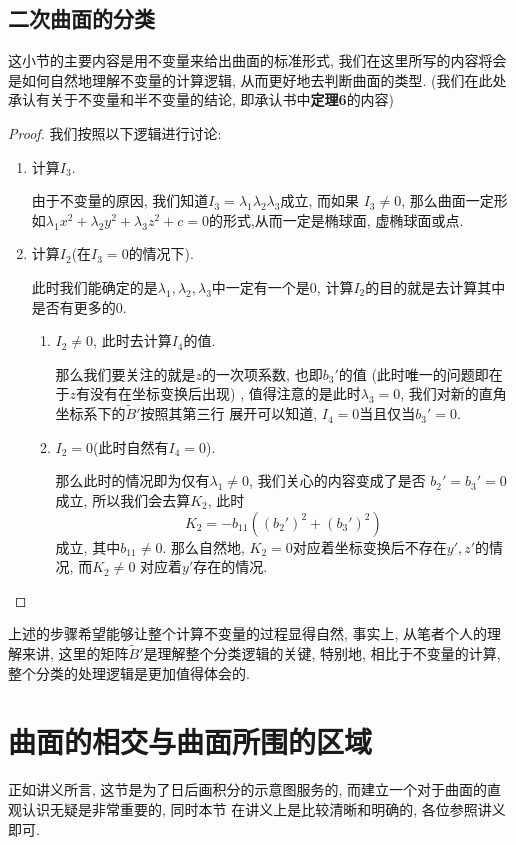 \documentclass[./main.tex]{subfiles}
\begin{document}
\subsection{二次曲面的分类}
这小节的主要内容是用不变量来给出曲面的标准形式, 我们在这里所写的内容将会是如何自然地理解不变量的计算逻辑, 从而更好地去判断曲面的类型.  (我们在此处承认有关于不变量和半不变量的结论, 即承认书中\textbf{定理6}的内容) 
\begin{proof}
我们按照以下逻辑进行讨论: 
\begin{enumerate}
    \item 计算$I_3$.

    由于不变量的原因, 我们知道$I_3=\lambda_1\lambda_2\lambda_3$成立, 而如果
    $I_3\neq 0$, 那么曲面一定形如$\lambda_1x^2+\lambda_2y^2+\lambda_3z^2+c=0$的形式,从而一定是椭球面, 虚椭球面或点. 
    \item 计算$I_2$(在$I_3=0$的情况下).

    此时我们能确定的是$\lambda_1,\lambda_2,\lambda_3$中一定有一个是$0$, 
    计算$I_2$的目的就是去计算其中是否有更多的0.
    \begin{enumerate}
        \item $I_2\neq0$, 此时去计算$I_4$的值.

        那么我们要关注的就是$z$的一次项系数, 也即$b_3'$的值 (此时唯一的问题即在于$z$有没有在坐标变换后出现) , 值得注意的是此时$\lambda_3=0$, 我们对新的直角坐标系下的$\tilde{B}'$按照其第三行
        展开可以知道, $I_4=0$当且仅当$b_3'=0$.
        \item   $I_2=0$(此时自然有$I_4=0$).

        那么此时的情况即为仅有$\lambda_1\neq0$, 我们关心的内容变成了是否
        $b_2'=b_3'=0$成立, 所以我们会去算$K_2$, 此时
        \[
        K_2=-b_{11}((b_2')^2+(b_3')^2)
        \]
        成立, 其中$b_{11}\neq0$. 那么自然地, $K_2=0$对应着坐标变换后不存在$y',z'$的情况, 而$K_2\neq0$
        对应着$y'$存在的情况.\qedhere 
\end{enumerate}
    \end{enumerate}
\end{proof}
上述的步骤希望能够让整个计算不变量的过程显得自然, 事实上, 从笔者个人的理解来讲, 这里的矩阵$\tilde{B}'$是理解整个分类逻辑的关键, 特别地, 相比于不变量的计算, 整个分类的处理逻辑是更加值得体会的. 
\section{曲面的相交与曲面所围的区域}
正如讲义所言, 这节是为了日后画积分的示意图服务的, 而建立一个对于曲面的直观认识无疑是非常重要的, 同时本节
在讲义上是比较清晰和明确的, 各位参照讲义即可. 
\end{document}
